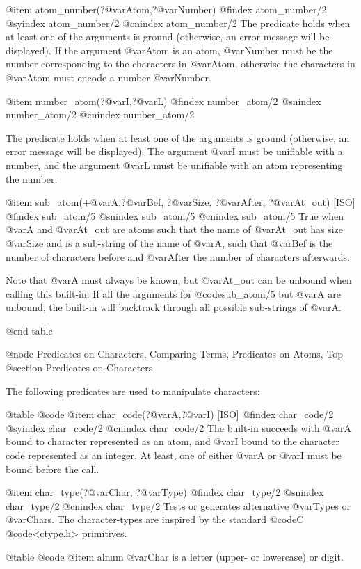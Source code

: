 {{{{@item atom_number(?@var{Atom},?@var{Number})
@findex atom_number/2
@syindex atom_number/2
@cnindex atom_number/2
The predicate holds when at least one of the arguments is ground
(otherwise, an error message will be displayed). If the argument
@var{Atom} is an atom, @var{Number} must be the number corresponding
to the characters in @var{Atom}, otherwise the characters in
@var{Atom} must encode a number @var{Number}.

@item number_atom(?@var{I},?@var{L})
@findex number_atom/2
@snindex number_atom/2
@cnindex number_atom/2

The predicate holds when at least one of the arguments is ground
(otherwise, an error message will be displayed). The argument @var{I} must
be unifiable with a number, and the argument @var{L} must be unifiable
with an atom representing the number.

@item sub_atom(+@var{A},?@var{Bef}, ?@var{Size}, ?@var{After}, ?@var{At_out}) [ISO]
@findex sub_atom/5
@snindex sub_atom/5
@cnindex sub_atom/5
True when @var{A} and @var{At_out} are atoms such that the name of
@var{At_out} has size @var{Size} and is a sub-string of the name of
@var{A}, such that @var{Bef} is the number of characters before and
@var{After} the number of characters afterwards.

Note that @var{A} must always be known, but @var{At_out} can be unbound when
calling this built-in. If all the arguments for @code{sub_atom/5} but @var{A}
are unbound, the built-in will backtrack through all possible
sub-strings of @var{A}.

@end table

@node Predicates on Characters, Comparing Terms, Predicates on Atoms, Top
@section Predicates on Characters

The following predicates are used to manipulate characters:

@table @code
@item char_code(?@var{A},?@var{I}) [ISO]
@findex char_code/2
@syindex char_code/2
@cnindex char_code/2
The built-in succeeds with @var{A} bound to character represented as an
atom, and @var{I} bound to the character code represented as an
integer. At least, one of either @var{A} or @var{I} must be bound before
the call.

@item char_type(?@var{Char}, ?@var{Type})
@findex char_type/2
@snindex char_type/2
@cnindex char_type/2
    Tests or generates alternative @var{Types} or @var{Chars}. The
    character-types are inspired by the standard @code{C}
    @code{<ctype.h>} primitives.

@table @code
@item    alnum
        @var{Char} is a letter (upper- or lowercase) or digit.

}}}}
